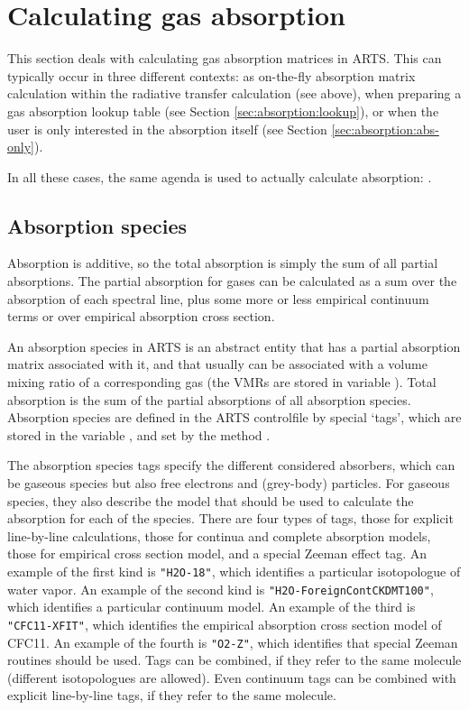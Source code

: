 \section{Calculating gas absorption}
\label{sec:absorption:calculating}

This section deals with calculating gas absorption matrices in ARTS.
This can typically occur in three different contexts: as on-the-fly
absorption matrix calculation within the radiative transfer
calculation (see above), when preparing a gas absorption lookup table
(see Section \ref{sec:absorption:lookup}), or when the user is only
interested in the absorption itself (see Section
\ref{sec:absorption:abs-only}).

In all these cases, the same agenda is used to actually calculate
absorption: .


\subsection{Absorption species}

Absorption is additive, so the total absorption is simply the sum of
all partial absorptions.  The partial absorption for gases can be calculated
as a sum over the absorption of each spectral line, plus some more or less
empirical continuum terms or over empirical absorption cross section.

An absorption species in ARTS is an abstract entity that has a partial
absorption matrix associated with it, and that usually can be
associated with a volume mixing ratio of a corresponding gas (the VMRs
are stored in variable ). Total absorption is the
sum of the partial absorptions of all absorption species. Absorption
species are defined in the ARTS controlfile by special `tags', which
are stored in the variable , and set by the
method .

The absorption species tags specify the different considered absorbers, which can
be gaseous species but also free electrons and (grey-body) particles.
For gaseous species, they also describe the model that should be used to
calculate the absorption for each of the species.
There are four types of tags, those for explicit line-by-line
calculations, those for continua and complete absorption models,
those for empirical cross section model, and a special Zeeman effect tag.
An example of the first kind is \verb|"H2O-18"|, which identifies a
particular isotopologue of water vapor. An example of the second kind is
\verb|"H2O-ForeignContCKDMT100"|, which identifies a particular continuum
model. An example of the third is \verb|"CFC11-XFIT"|, which identifies the
empirical absorption cross section model of CFC11.
An example of the fourth is \verb|"O2-Z"|, which identifies that special Zeeman
routines should be used.
Tags can be combined, if they refer to the same molecule
(different isotopologues are allowed). Even continuum tags can be combined
with explicit line-by-line tags, if they refer to the same molecule.

